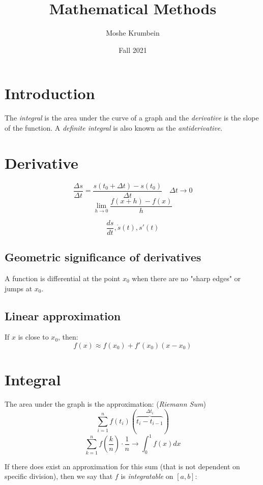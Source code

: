 \documentclass[00_complete]{subfiles}
\title{Mathematical Methods}
\author{Moshe Krumbein}
\date{Fall 2021}
\begin{document}

\section{Introduction}

The \emph{integral} is the area under the curve of a graph and the
\emph{derivative} is the slope of the function. A \emph{definite integral} is
also known as the \emph{antiderivative}.

\section{Derivative}

\begin{definition}[Derivative]
\[
    \frac{\Delta s}{\Delta t} = \frac{s(t_0+\Delta t)-s(t_0)}{\Delta t}
    \quad \Delta t \to 0
\]
$$\lim\limits_{h \to 0} \frac{f(x+h)-f(x)}{h}$$
\end{definition}


\begin{symbols}[Derivative]
    $$\frac{ds}{dt}, \dot s(t), s'(t)$$
\end{symbols}

\subsection{Geometric significance of derivatives}

A function is differential at the point $x_0$ when there are no "sharp edges"
or jumps at $x_0$.

\subsection{Linear approximation}

If $x$ is close to $x_0$, then:
$$f(x) \approx f(x_0)+f'(x_0)(x-x_0)$$

\section{Integral}

The area under the graph is the approximation: (\emph{Riemann Sum})
$$\sum_{i=1}^{n}f(t_i)(\overbrace{t_i-t_{i-1}}^{\Delta t_i})$$
$$\sum_{k=1}^{n}f\left(\frac{k}{n}\right)\cdot \frac{1}{n} \to
\int_{0}^{1}f(x)dx$$

If there does exist an approximation for this sum (that is not dependent on
specific division), then we say that $f$ is \emph{integratable} on $[a,b]$:
\end{document}
